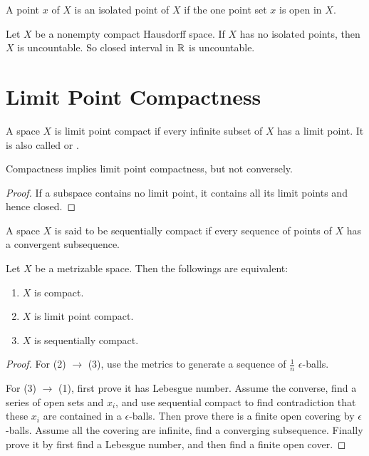\begin{definition}
    A point $x$ of $X$ is an isolated point of $X$ if the one point set ${x}$ is open in $X$.
\end{definition}

\begin{theorem}
    Let $X$ be a nonempty compact Hausdorff space. If $X$ has no isolated points, then $X$ is uncountable.
    So closed interval in $\mathbb{R}$ is uncountable.
\end{theorem}




\section{Limit Point Compactness}

\begin{definition}
    A space $X$ is limit point compact if every infinite subset of $X$ has a limit point. It is also called  or .
\end{definition}

\begin{theorem}
    Compactness implies limit point compactness, but not conversely.    
\end{theorem}
\begin{proof}
    If a subspace contains no limit point, it contains all its limit points and hence closed.
\end{proof}

\begin{definition}
    A space $X$ is said to be sequentially compact if every sequence of points of $X$ has a convergent subsequence.
\end{definition}

\begin{theorem}
    Let $X$ be a metrizable space. Then the followings are equivalent:
    \begin{enumerate}
        \item $X$ is compact.
        \item $X$ is limit point compact.
        \item $X$ is sequentially compact.
    \end{enumerate}    
\end{theorem}
\begin{proof}
    For (2) $\rightarrow$ (3), use the metrics to generate a sequence of $\frac{1}{n}$ $\epsilon$-balls.
    
    For (3) $\rightarrow$ (1), first prove it has Lebesgue number. Assume the converse, find a series of open sets and $x_i$, and use sequential compact to find contradiction that these $x_i$ are contained in a $\epsilon$-balls. Then prove there is a finite open covering by $\epsilon$-balls. Assume all the covering are infinite, find a converging subsequence. Finally prove it by first find a Lebesgue number, and then find a finite open cover.
\end{proof}


